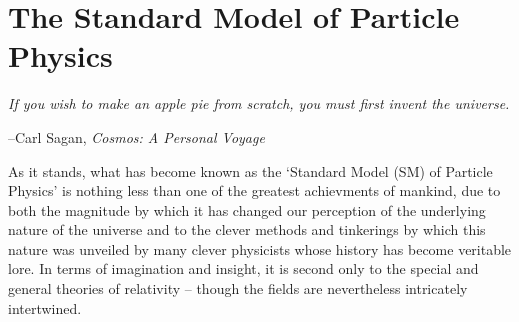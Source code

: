 \chapter{The Standard Model of Particle Physics}

	

\epigraph{\textit{If you wish to make an apple pie from scratch, you must first invent the universe.}}{--Carl Sagan, \textit{Cosmos: A Personal Voyage}}


As it stands, what has become known as the `Standard Model (SM) of Particle Physics'
is nothing less than one of the greatest achievments of mankind, due to both
the magnitude by which it has changed our perception of the underlying
nature of the universe and to the clever methods and tinkerings by which this
nature was unveiled by many clever physicists whose history has become veritable lore.
In terms of imagination and insight, it is second only to the special and general theories of relativity --
though the fields are nevertheless intricately intertwined.

